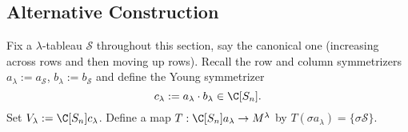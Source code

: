 \documentclass[../main.tex]{subfiles}
\begin{document}
\subsection{Alternative Construction}

Fix a $ \lambda $-tableau $ \mathcal{S} $ throughout this section, say the canonical one (increasing across rows and then moving up rows).
Recall the row and column symmetrizers $ a_{\lambda}:=a_{\mathcal{S}} $, $ b_{\lambda}:=b_{\mathcal{S}} $ and define the Young symmetrizer 
\[
  c_{\lambda} := a_{\lambda}\cdot b_{\lambda}\in \C[S_{n}].
\]
Set $ V_{\lambda} := \C[S_{n}]c_{\lambda} $. Define a map $ T:\C[S_{n}]a_{\lambda} \to M^{\lambda} $ by $ T(\sigma a_{\lambda})= \{\sigma \mathcal{S}\} $. 
%
%
%
%
%
\end{document}
